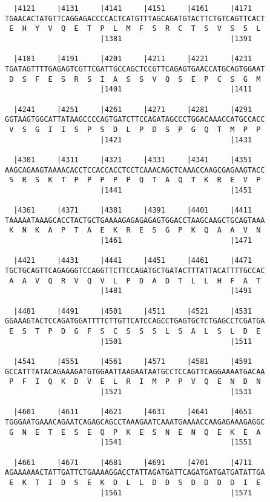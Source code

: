 \documentclass{article}
\begin{document}
\begin{Verbatim}
  |4121     |4131     |4141     |4151     |4161     |4171   
TGAACACTATGTTCAGGAGACCCCACTCATGTTTAGCAGATGTACTTCTGTCAGTTCACT
 E  H  Y  V  Q  E  T  P  L  M  F  S  R  C  T  S  V  S  S  L 
                      |1381                         |1391   
  
  |4181     |4191     |4201     |4211     |4221     |4231   
TGATAGTTTTGAGAGTCGTTCGATTGCCAGCTCCGTTCAGAGTGAACCATGCAGTGGAAT
 D  S  F  E  S  R  S  I  A  S  S  V  Q  S  E  P  C  S  G  M 
                      |1401                         |1411   
  
  |4241     |4251     |4261     |4271     |4281     |4291   
GGTAAGTGGCATTATAAGCCCCAGTGATCTTCCAGATAGCCCTGGACAAACCATGCCACC
 V  S  G  I  I  S  P  S  D  L  P  D  S  P  G  Q  T  M  P  P 
                      |1421                         |1431   
  
  |4301     |4311     |4321     |4331     |4341     |4351   
AAGCAGAAGTAAAACACCTCCACCACCTCCTCAAACAGCTCAAACCAAGCGAGAAGTACC
 S  R  S  K  T  P  P  P  P  P  Q  T  A  Q  T  K  R  E  V  P 
                      |1441                         |1451   
  
  |4361     |4371     |4381     |4391     |4401     |4411   
TAAAAATAAAGCACCTACTGCTGAAAAGAGAGAGAGTGGACCTAAGCAAGCTGCAGTAAA
 K  N  K  A  P  T  A  E  K  R  E  S  G  P  K  Q  A  A  V  N 
                      |1461                         |1471   
  
  |4421     |4431     |4441     |4451     |4461     |4471   
TGCTGCAGTTCAGAGGGTCCAGGTTCTTCCAGATGCTGATACTTTATTACATTTTGCCAC
 A  A  V  Q  R  V  Q  V  L  P  D  A  D  T  L  L  H  F  A  T 
                      |1481                         |1491   
  
  |4481     |4491     |4501     |4511     |4521     |4531   
GGAAAGTACTCCAGATGGATTTTCTTGTTCATCCAGCCTGAGTGCTCTGAGCCTCGATGA
 E  S  T  P  D  G  F  S  C  S  S  S  L  S  A  L  S  L  D  E 
                      |1501                         |1511   
  
  |4541     |4551     |4561     |4571     |4581     |4591   
GCCATTTATACAGAAAGATGTGGAATTAAGAATAATGCCTCCAGTTCAGGAAAATGACAA
 P  F  I  Q  K  D  V  E  L  R  I  M  P  P  V  Q  E  N  D  N 
                      |1521                         |1531   
  
  |4601     |4611     |4621     |4631     |4641     |4651   
TGGGAATGAAACAGAATCAGAGCAGCCTAAAGAATCAAATGAAAACCAAGAGAAAGAGGC
 G  N  E  T  E  S  E  Q  P  K  E  S  N  E  N  Q  E  K  E  A 
                      |1541                         |1551   
  
  |4661     |4671     |4681     |4691     |4701     |4711   
AGAAAAAACTATTGATTCTGAAAAGGACCTATTAGATGATTCAGATGATGATGATATTGA
 E  K  T  I  D  S  E  K  D  L  L  D  D  S  D  D  D  D  I  E 
                      |1561                         |1571   
  

\end{Verbatim}
\end{document}
